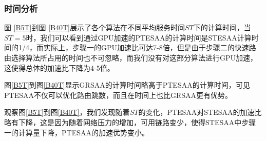 \subsubsection{时间分析}

图 \ref{B5T}到图 \ref{B40T}展示了各个算法在不同平均服务时间$ST$下的计算时间，当$ST=5$时，我们可以看到通过GPU加速的PTESAA的计算时间是STESAA计算时间的1/4，而实际上，步骤一的GPU加速比可达7-8倍，但是由于步骤二的快速路由选择算法所占用的时间也不可忽略，而我们没有对这部分算法进行GPU加速，这使得总体的加速比下降为4-5倍。

图\ref{B5T}到图\ref{B40T}显示GRSAA的计算时间略高于PTESAA的计算时间，可见PTESAA不仅可以优化路由跳数，而且在时间上也比GRSAA更有优势。

观察图\ref{B5T}到图\ref{B40T}，我们发现随着$ST$的变化，PTESAA对STESAA的加速比略有下降，这是因为随着网络压力的增加，可用链路变少，使得STESAA中步骤一的计算量下降，PTESAA的加速优势变小。
